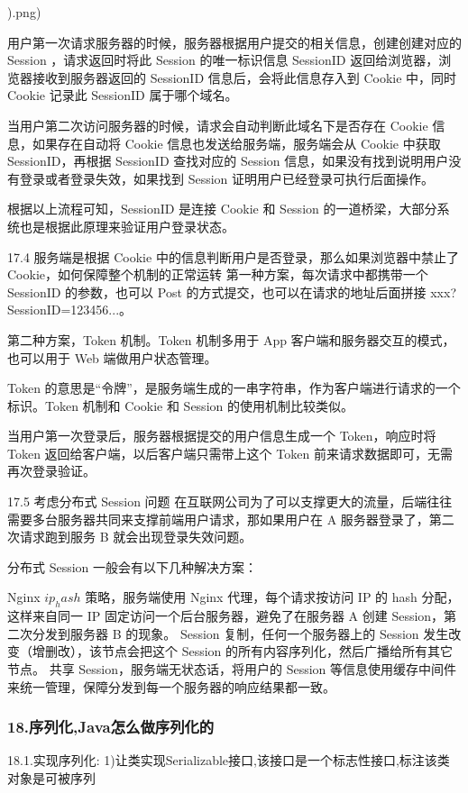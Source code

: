 \documentclass[UTF8]{ctexart}
\begin{document}
).png)

用户第一次请求服务器的时候，服务器根据用户提交的相关信息，创建创建对应的 Session ，请求返回时将此 Session 的唯一标识信息 SessionID 返回给浏览器，浏览器接收到服务器返回的 SessionID 信息后，会将此信息存入到 Cookie 中，同时 Cookie 记录此 SessionID 属于哪个域名。

当用户第二次访问服务器的时候，请求会自动判断此域名下是否存在 Cookie 信息，如果存在自动将 Cookie 信息也发送给服务端，服务端会从 Cookie 中获取 SessionID，再根据 SessionID 查找对应的 Session 信息，如果没有找到说明用户没有登录或者登录失效，如果找到 Session 证明用户已经登录可执行后面操作。

根据以上流程可知，SessionID 是连接 Cookie 和 Session 的一道桥梁，大部分系统也是根据此原理来验证用户登录状态。

17.4 服务端是根据 Cookie 中的信息判断用户是否登录，那么如果浏览器中禁止了 Cookie，如何保障整个机制的正常运转
第一种方案，每次请求中都携带一个 SessionID 的参数，也可以 Post 的方式提交，也可以在请求的地址后面拼接 xxx?SessionID=123456...。

第二种方案，Token 机制。Token 机制多用于 App 客户端和服务器交互的模式，也可以用于 Web 端做用户状态管理。

Token 的意思是“令牌”，是服务端生成的一串字符串，作为客户端进行请求的一个标识。Token 机制和 Cookie 和 Session 的使用机制比较类似。

当用户第一次登录后，服务器根据提交的用户信息生成一个 Token，响应时将 Token 返回给客户端，以后客户端只需带上这个 Token 前来请求数据即可，无需再次登录验证。

17.5 考虑分布式 Session 问题
在互联网公司为了可以支撑更大的流量，后端往往需要多台服务器共同来支撑前端用户请求，那如果用户在 A 服务器登录了，第二次请求跑到服务 B 就会出现登录失效问题。

分布式 Session 一般会有以下几种解决方案：

Nginx $ip_hash$ 策略，服务端使用 Nginx 代理，每个请求按访问 IP 的 hash 分配，这样来自同一 IP 固定访问一个后台服务器，避免了在服务器 A 创建 Session，第二次分发到服务器 B 的现象。
Session 复制，任何一个服务器上的 Session 发生改变（增删改），该节点会把这个 Session 的所有内容序列化，然后广播给所有其它节点。
共享 Session，服务端无状态话，将用户的 Session 等信息使用缓存中间件来统一管理，保障分发到每一个服务器的响应结果都一致。
\subsubsection{18.序列化,Java怎么做序列化的}
18.1.实现序列化:
1)让类实现Serializable接口,该接口是一个标志性接口,标注该类对象是可被序列
\end{document}
